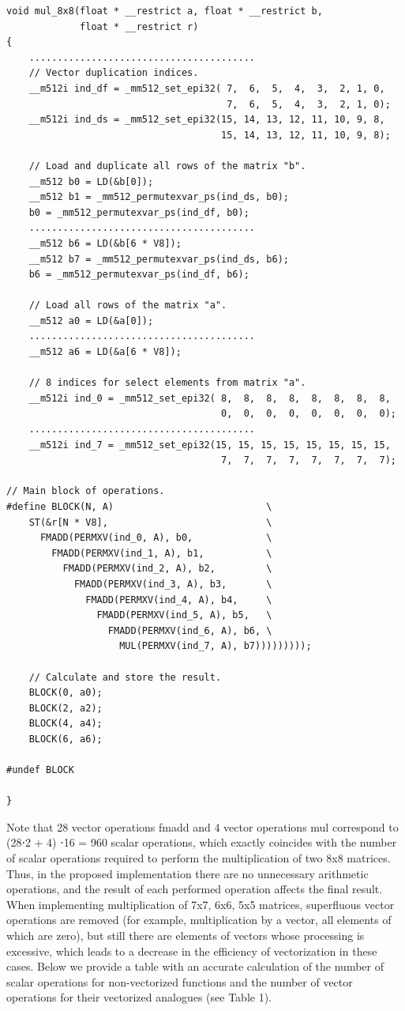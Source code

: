 \documentclass[
11pt,%
tightenlines,%
twoside,%
onecolumn,%
nofloats,%
nobibnotes,%
nofootinbib,%
superscriptaddress,%
noshowpacs,%
centertags]%
{revtex4}
\begin{document}
\begin{lstlisting}
void mul_8x8(float * __restrict a, float * __restrict b,
             float * __restrict r)
{
    ........................................
    // Vector duplication indices.
    __m512i ind_df = _mm512_set_epi32( 7,  6,  5,  4,  3,  2, 1, 0,
                                       7,  6,  5,  4,  3,  2, 1, 0);
    __m512i ind_ds = _mm512_set_epi32(15, 14, 13, 12, 11, 10, 9, 8,
                                      15, 14, 13, 12, 11, 10, 9, 8);

    // Load and duplicate all rows of the matrix "b".
    __m512 b0 = LD(&b[0]);
    __m512 b1 = _mm512_permutexvar_ps(ind_ds, b0);
    b0 = _mm512_permutexvar_ps(ind_df, b0);
    ........................................
    __m512 b6 = LD(&b[6 * V8]);
    __m512 b7 = _mm512_permutexvar_ps(ind_ds, b6);
    b6 = _mm512_permutexvar_ps(ind_df, b6);

    // Load all rows of the matrix "a".
    __m512 a0 = LD(&a[0]);
    ........................................
    __m512 a6 = LD(&a[6 * V8]);

    // 8 indices for select elements from matrix "a".
    __m512i ind_0 = _mm512_set_epi32( 8,  8,  8,  8,  8,  8,  8,  8,
                                      0,  0,  0,  0,  0,  0,  0,  0);
    ........................................
    __m512i ind_7 = _mm512_set_epi32(15, 15, 15, 15, 15, 15, 15, 15,
                                      7,  7,  7,  7,  7,  7,  7,  7);

// Main block of operations.
#define BLOCK(N, A)                           \
    ST(&r[N * V8],                            \
      FMADD(PERMXV(ind_0, A), b0,             \
        FMADD(PERMXV(ind_1, A), b1,           \
          FMADD(PERMXV(ind_2, A), b2,         \
            FMADD(PERMXV(ind_3, A), b3,       \
              FMADD(PERMXV(ind_4, A), b4,     \
                FMADD(PERMXV(ind_5, A), b5,   \
                  FMADD(PERMXV(ind_6, A), b6, \
                    MUL(PERMXV(ind_7, A), b7)))))))));

    // Calculate and store the result.
    BLOCK(0, a0);
    BLOCK(2, a2);
    BLOCK(4, a4);
    BLOCK(6, a6);

#undef BLOCK

}
\end{lstlisting}

Note that 28 vector operations fmadd and 4 vector operations mul correspond to (28⋅2 + 4) ⋅16 = 960 scalar operations, which exactly coincides with the number of scalar operations required to perform the multiplication of two 8x8 matrices. Thus, in the proposed implementation there are no unnecessary arithmetic operations, and the result of each performed operation affects the final result.
When implementing multiplication of 7x7, 6x6, 5x5 matrices, superfluous vector operations are removed (for example, multiplication by a vector, all elements of which are zero), but still there are elements of vectors whose processing is excessive, which leads to a decrease in the efficiency of vectorization in these cases. Below we provide a table with an accurate calculation of the number of scalar operations for non-vectorized functions and the number of vector operations for their vectorized analogues (see Table 1).
\end{document}
